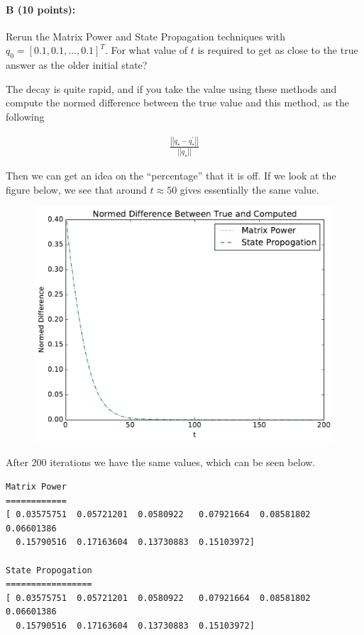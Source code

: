 \documentclass[11pt]{article}
\begin{document}
\paragraph{B (10 points):}
Rerun the \textsf{Matrix Power} and \textsf{State Propagation} techniques with $q_0 = [0.1, 0.1, \ldots, 0.1]^T$.  For what value of $t$ is required to get as close to the true answer as the older initial state?

The decay is quite rapid, and if you take the value using these methods and compute the normed difference between the true value and this method, as the following

\begin{align*}
  \frac{\left|\left| q_{\star} - q_{\star}^{\prime}\right|\right|}{\left|\left| q_{\star}\right|\right|}
\end{align*}

Then we can get an idea on the ``percentage'' that it is off. If we look at the figure below, we see that around $t\approx 50$ gives essentially the same value.

\begin{figure}[h]
\centering
\includegraphics[width=.75\linewidth]{partb.pdf}
\end{figure}

After 200 iterations we have the same values, which can be seen below.

\begin{lstlisting}[breaklines]
Matrix Power
============
[ 0.03575751  0.05721201  0.0580922   0.07921664  0.08581802  0.06601386
  0.15790516  0.17163604  0.13730883  0.15103972]

State Propogation
=================
[ 0.03575751  0.05721201  0.0580922   0.07921664  0.08581802  0.06601386
  0.15790516  0.17163604  0.13730883  0.15103972]
\end{lstlisting}
\end{document}
